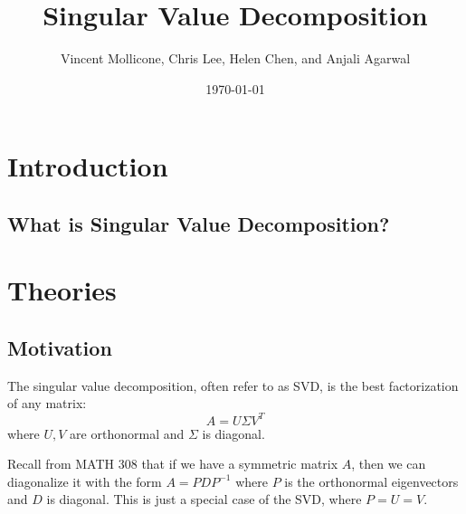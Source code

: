 \documentclass{article}
\title{Singular Value Decomposition}
\author{Vincent Mollicone, Chris Lee, Helen Chen, and Anjali Agarwal}
\date{\today}
\begin{document}
\maketitle

\section{Introduction}
\subsection{What is Singular Value Decomposition?}


\section{Theories}
\subsection{Motivation}
The singular value decomposition, often refer to as SVD, is the best factorization of any matrix:
$$A = U \Sigma V^T$$
where $U,V$ are orthonormal and $\Sigma$ is diagonal.

Recall from MATH 308 that if we have a symmetric matrix $A$, then we can diagonalize it with the form $A=PDP^{-1}$ where $P$ is the orthonormal eigenvectors and $D$ is diagonal. This is just a special case of the SVD, where $P = U = V$.
\end{document}
